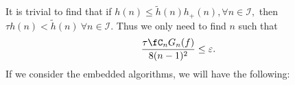 It is trivial to find that if $h(n) \leq \tilde{h}(n) h_{+}(n), \forall n \in \mathcal{I},$ then $ \tau h(n)< \tilde{h}(n) \ \forall n \in \mathcal{I}.$ %
Thus we only need to find $n$ such that
\[
\frac{\tau \fC_n G_{n}(f)}{8(n-1)^2} \le \varepsilon.
\]
If we consider the embedded algorithms, we will have the following:
